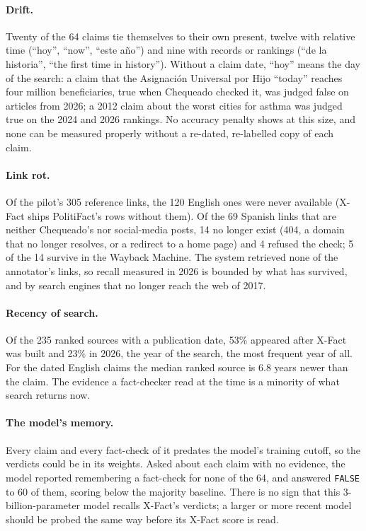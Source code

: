 \paragraph{Drift.} Twenty of the 64 claims tie themselves to their own
present, twelve with relative time (``hoy'', ``now'', ``este año'') and
nine with records or rankings (``de la historia'', ``the first time in
history''). Without a claim date, ``hoy'' means the day of the search: a
claim that the Asignación Universal por Hijo ``today'' reaches four
million beneficiaries, true when Chequeado checked it, was judged false
on articles from 2026; a 2012 claim about the worst cities for asthma
was judged true on the 2024 and 2026 rankings. No accuracy penalty
shows at this size, and none can be measured properly without a
re-dated, re-labelled copy of each claim.

\paragraph{Link rot.} Of the pilot's 305 reference links, the 120
English ones were never available (X-Fact ships PolitiFact's rows
without them). Of the 69 Spanish links that are neither Chequeado's
nor social-media posts, 14 no longer exist (404, a domain that no
longer resolves, or a redirect to a home page) and 4 refused the check;
5 of the 14 survive in the Wayback Machine. The system retrieved none
of the annotator's links, so recall measured in 2026 is bounded by what
has survived, and by search engines that no longer reach the web of
2017.

\paragraph{Recency of search.} Of the 235 ranked sources with a
publication date, 53\% appeared after X-Fact was built and 23\% in 2026,
the year of the search, the most frequent year of all. For the dated
English claims the median ranked source is 6.8 years newer than the
claim. The evidence a fact-checker read at the time is a minority of
what search returns now.

\paragraph{The model's memory.} Every claim and every fact-check of it
predates the model's training cutoff, so the verdicts could be in its
weights. Asked about each claim with no evidence, the model reported
remembering a fact-check for none of the 64, and answered
\texttt{FALSE} to 60 of them, scoring below the majority baseline.
There is no sign that this 3-billion-parameter model recalls X-Fact's
verdicts; a larger or more recent model should be probed the same way
before its X-Fact score is read.

